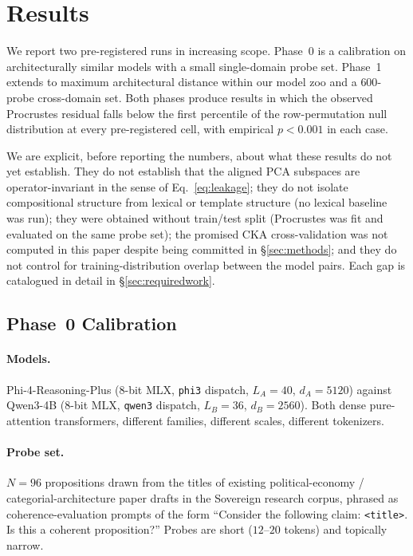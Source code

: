 \section{Results}
\label{sec:results}

We report two pre-registered runs in increasing scope. Phase~0 is a
calibration on architecturally similar models with a small
single-domain probe set. Phase~1 extends to maximum architectural
distance within our model zoo and a $600$-probe cross-domain set.
Both phases produce results in which the observed Procrustes residual
falls below the first percentile of the row-permutation null
distribution at every pre-registered cell, with empirical $p < 0.001$
in each case.

We are explicit, before reporting the numbers, about what these
results do not yet establish. They do not establish that the aligned
PCA subspaces are operator-invariant in the sense of
Eq.~\eqref{eq:leakage}; they do not isolate compositional structure
from lexical or template structure (no lexical baseline was run); they
were obtained without train/test split (Procrustes was fit and
evaluated on the same probe set); the promised CKA cross-validation
\cite{kornblith2019similarity} was not computed in this paper despite
being committed in \S\ref{sec:methods}; and they do not control for
training-distribution overlap between the model pairs. Each gap is
catalogued in detail in \S\ref{sec:requiredwork}.

\subsection{Phase~0 Calibration}
\label{sec:results-phase0}

\paragraph{Models.} Phi-4-Reasoning-Plus (8-bit MLX, \texttt{phi3}
dispatch, $L_A = 40$, $d_A = 5120$) against Qwen3-4B (8-bit MLX,
\texttt{qwen3} dispatch, $L_B = 36$, $d_B = 2560$). Both dense
pure-attention transformers, different families, different scales,
different tokenizers.

\paragraph{Probe set.} $N = 96$ propositions drawn from the titles of
existing political-economy / categorial-architecture paper drafts in
the Sovereign research corpus, phrased as coherence-evaluation prompts
of the form ``Consider the following claim: \texttt{<title>}. Is this
a coherent proposition?'' Probes are short ($12$--$20$ tokens) and
topically narrow.

